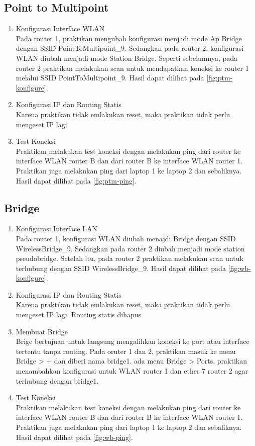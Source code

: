\subsection{Point to Multipoint}
\begin{enumerate}
  \item Konfigurasi Interface WLAN \\
  Pada router 1, praktikan mengubah konfigurasi menjadi mode Ap Bridge dengan SSID PointToMultipoint\_9. Sedangkan pada router 2, konfigurasi WLAN diubah menjadi mode Station Bridge. Seperti sebelumnya, pada router 2 praktikan melakukan scan untuk mendapatkan koneksi ke router 1 melalui SSID PointToMultipoint\_9. Hasil dapat dilihat pada \ref{fig:ptm-konfigure}.
  \item Konfigurasi IP dan Routing Statis\\
  Karena praktikan tidak emlakukan reset, maka praktikan tidak perlu mengeset IP lagi.
  \item Test Koneksi \\
  Praktikan melakukan test koneksi dengan melakukan ping dari router ke interface WLAN router B dan dari router B ke interface WLAN router 1. Praktikan juga melakukan ping dari laptop 1 ke laptop 2 dan sebaliknya. Hasil dapat dilihat pada \ref{fig:ptm-ping}.
\end{enumerate}

\subsection{Bridge}
\begin{enumerate}
  \item Konfigurasi Interface LAN \\
  Pada router 1, konfigurasi WLAN diubah menajdi Bridge dengan SSID WirelessBridge\_9. Sedangkan pada router 2 diubah menjadi mode station pseudobridge. Setelah itu, pada router 2 praktikan melakukan scan untuk terhubung dengan SSID WirelessBridge\_9. Hasil dapat dilihat pada \ref{fig:wb-konfigure}.
  \item Konfigurasi IP dan Routing Statis\\
  Karena praktikan tidak emlakukan reset, maka praktikan tidak perlu mengeset IP lagi. Routing statis dihapus
  \item Membuat Bridge \\
  Brige bertujuan untuk langsung mengalihkan koneksi ke port atau interface tertentu tanpa routing. Pada oruter 1 dan 2, praktikan masuk ke menu Bridge > + dan diberi nama bridge1. ada menu Bridge > Ports, praktikan menambahkan konfigurasi untuk WLAN router 1 dan ether 7 router 2 agar terhubung dengan bridge1.
  \item Test Koneksi \\
  Praktikan melakukan test koneksi dengan melakukan ping dari router ke interface WLAN router B dan dari router B ke interface WLAN router 1. Praktikan juga melakukan ping dari laptop 1 ke laptop 2 dan sebaliknya. Hasil dapat dilihat pada \ref{fig:wb-ping}.
\end{enumerate}

